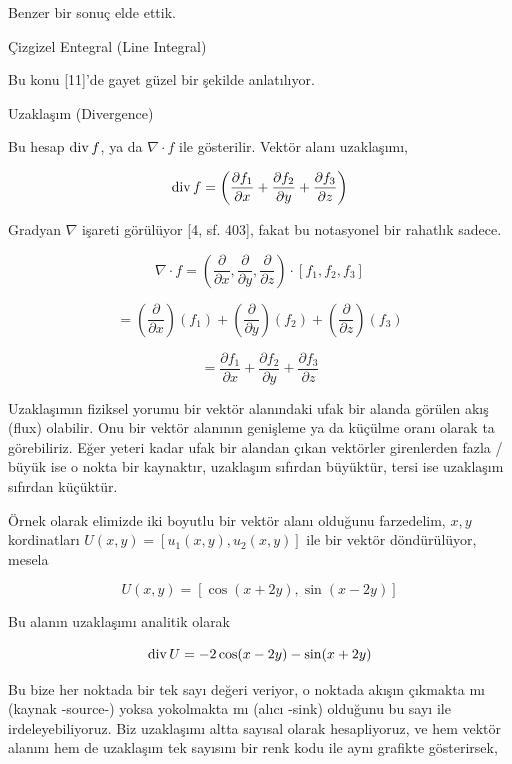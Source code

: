 \documentclass[12pt,fleqn]{article}\usepackage{../../common}
\begin{document}
Benzer bir sonuç elde ettik.

Çizgizel Entegral (Line Integral)

Bu konu [11]'de gayet güzel bir şekilde anlatılıyor. 

Uzaklaşım (Divergence)

Bu hesap $\operatorname{div} f$, ya da $\nabla \cdot f$ ile gösterilir. Vektör alanı
uzaklaşımı,

$$
\operatorname{div} f = \left(
\frac{\partial f_1}{\partial x} + 
\frac{\partial f_2}{\partial y} + 
\frac{\partial f_3}{\partial z} 
\right)
$$

Gradyan $\nabla$ işareti görülüyor [4, sf. 403], fakat bu notasyonel bir
rahatlık sadece.

$$
\nabla \cdot f = \left(
\frac{\partial }{\partial x},
\frac{\partial }{\partial y},
\frac{\partial }{\partial z} 
\right) 
\cdot
\left[ f_1, f_2, f_3 \right]
$$

$$
= \left( \frac{\partial }{\partial x} \right)(f_1) + 
\left( \frac{\partial }{\partial y} \right)(f_2) + 
\left( \frac{\partial }{\partial z} \right)(f_3) 
$$

$$
= \frac{\partial f_1}{\partial x} +
\frac{\partial f_2}{\partial y} +
\frac{\partial f_3}{\partial z}
$$

Uzaklaşımın fiziksel yorumu bir vektör alanındaki ufak bir alanda görülen akış
(flux) olabilir. Onu bir vektör alanının genişleme ya da küçülme oranı olarak ta
görebiliriz. Eğer yeteri kadar ufak bir alandan çıkan vektörler girenlerden
fazla / büyük ise o nokta bir kaynaktır, uzaklaşım sıfırdan büyüktür, tersi ise
uzaklaşım sıfırdan küçüktür.

Örnek olarak elimizde iki boyutlu bir vektör alanı olduğunu farzedelim, $x,y$
kordinatları $U(x,y) = [u_1(x,y), u_2(x,y)]$ ile bir vektör döndürülüyor, mesela

$$
U(x,y) = [\cos(x + 2y), \sin(x - 2y)]
$$

Bu alanın uzaklaşımı analitik olarak

$$
\operatorname{div} U = - 2\cos(x - 2y) - \sin(x + 2y)
$$

Bu bize her noktada bir tek sayı değeri veriyor, o noktada akışın çıkmakta mı
(kaynak -source-) yoksa yokolmakta mı (alıcı -sink) olduğunu bu sayı ile
irdeleyebiliyoruz. Biz uzaklaşımı altta sayısal olarak hesapliyoruz, ve hem
vektör alanını hem de uzaklaşım tek sayısını bir renk kodu ile aynı grafikte
gösterirsek,
\end{document}
